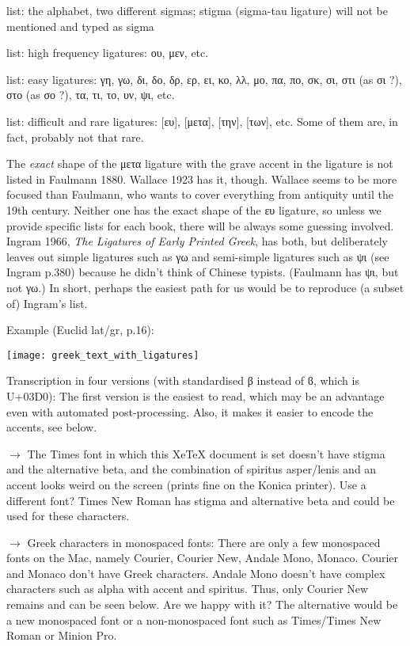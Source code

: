 list: the alphabet, two different sigmas; stigma (sigma-tau ligature) will not be mentioned and typed as sigma

list: high frequency ligatures: ου, μεν, etc.

list: easy ligatures: γη, γω, δι, δο, δρ, ερ, ει, κο, λλ, μο, πα, πο, σκ, σι, στι  (as σι ?), στο  (as σο ?), τα, τι, το, υν, ψι, etc. 

list: difficult and rare ligatures: [ευ], [μετα], [την], [των], etc. Some of them are, in fact, probably not that rare. 

The \emph{exact} shape of the μετα ligature with the grave accent in the ligature is not listed in Faulmann 1880. Wallace 1923 has it, though. Wallace seems to be more focused than Faulmann, who wants to cover everything from antiquity until the 19th century. 
Neither one has the exact shape of the ευ ligature, so unless we provide specific lists for each book, there will be always some guessing involved. Ingram 1966, \emph{The Ligatures of Early Printed Greek}, has both, but deliberately leaves out simple ligatures such as γω and semi-simple ligatures such as ψι (see Ingram p.380) because he didn't think of Chinese typists. (Faulmann has ψι, but not γω.) In short, perhaps the easiest path for us would be to reproduce (a subset of) Ingram's list.

Example (Euclid lat/gr, p.16):

\texttt{[image: greek\_text\_with\_ligatures]} 

Transcription in four versions (with standardised β instead of ϐ, which is U+03D0): The first version is the easiest to read, which may be an advantage even with automated post-processing. Also, it makes it easier to encode the accents, see below.

$\to$ The Times font in which this XeTeX document is set doesn't have stigma and the alternative beta, and the combination of spiritus asper/lenis and an accent looks weird on the screen (prints fine on the Konica printer). Use a different font? Times New Roman has stigma and alternative beta and could be used for these characters.

$\to$ Greek characters in monospaced fonts: There are only a few monospaced fonts on the Mac, namely Courier, Courier New, Andale Mono, Monaco. Courier and Monaco don't have Greek characters. Andale Mono doesn't have complex characters such as alpha with accent and spiritus. Thus, only Courier New remains and can be seen below. Are we happy with it? The alternative would be a new monospaced font or a non-monospaced font such as Times/Times New Roman or Minion Pro.

